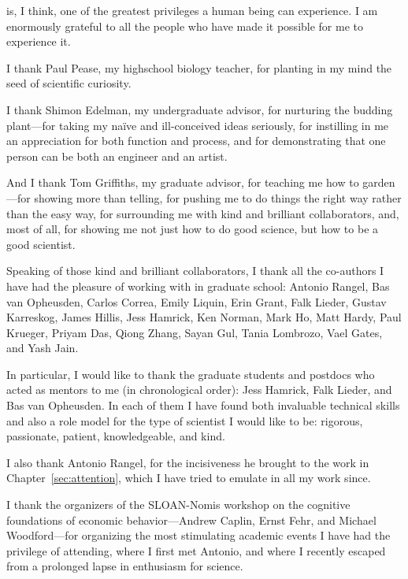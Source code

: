 
 is, I think, one of the greatest privileges a human being can experience. I am enormously grateful to all the people who have made it possible for me to experience it.

I thank Paul Pease, my highschool biology teacher, for planting in my mind the seed of scientific curiosity.

I thank Shimon Edelman, my undergraduate advisor, for nurturing the budding plant---for taking my na\"ive and ill-conceived ideas seriously, for instilling in me an appreciation for both function and process, and for demonstrating that one person can be both an engineer and an artist.

And I thank Tom Griffiths, my graduate advisor, for teaching me how to garden---for showing more than telling, for pushing me to do things the right way rather than the easy way, for surrounding me with kind and brilliant collaborators, and, most of all, for showing me not just how to do good science, but how to be a good scientist.

Speaking of those kind and brilliant collaborators, I thank all the co-authors I have had the pleasure of working with in graduate school: Antonio Rangel, Bas van Opheusden, Carlos Correa, Emily Liquin, Erin Grant, Falk Lieder, Gustav Karreskog, James Hillis, Jess Hamrick, Ken Norman, Mark Ho, Matt Hardy, Paul Krueger, Priyam Das, Qiong Zhang, Sayan Gul, Tania Lombrozo, Vael Gates, and Yash Jain.

In particular, I would like to thank the graduate students and postdocs who acted as mentors to me (in chronological order): Jess Hamrick, Falk Lieder, and Bas van Opheusden. In each of them I have found both invaluable technical skills and also a role model for the type of scientist I would like to be: rigorous, passionate, patient, knowledgeable, and kind.

I also thank Antonio Rangel, for the incisiveness he brought to the work in Chapter~\ref{sec:attention}, which I have tried to emulate in all my work since.

I thank the organizers of the SLOAN-Nomis workshop on the cognitive foundations of economic behavior---Andrew Caplin, Ernst Fehr, and Michael Woodford---for organizing the most stimulating academic events I have had the privilege of attending, where I first met Antonio, and where I recently escaped from a prolonged lapse in enthusiasm for science.

